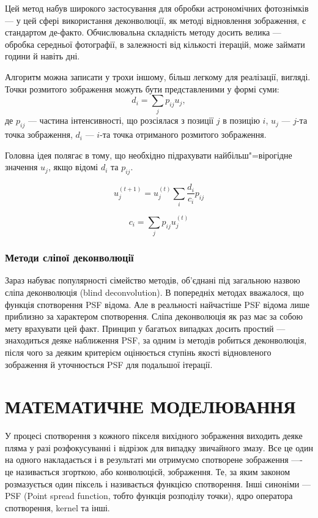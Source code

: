 \documentclass{diploma}
\begin{document}
      Цей метод набув широкого застосування для обробки астрономічних
      фотознімків --- у цей сфері використання деконволюції, як методі
      відновлення зображення, є стандартом де-факто.
      Обчислювальна складність методу досить велика --- обробка середньої
      фотографії, в залежності від кількості ітерацій, може займати години й
      навіть дні.

      Алгоритм можна записати у трохи іншому, більш легкому для реалізації,
      вигляді.
      Точки розмитого зображення можуть бути представленими у формі суми:
      \[ d_i = \sum_j p_{ij} u_j, \]
      де $p_{ij}$ --- частина інтенсивності, що розсіялася з позиції $j$ в
      позицію $i$, $u_j$ --- $j$-та точка зображення, $d_i$ --- $i$-та точка
      отриманого розмитого зображення.\cite{richardson-hadley}

      Головна ідея полягає в тому, що необхідно підрахувати найбільш"=вірогідне
      значення $u_j$, якщо відомі $d_i$ та $p_{ij}$.

      \begin{equation}
        u_j^{(t+1)} = u_j^{(t)} \sum_i \frac{d_i}{c_i} p_{ij}
        \label{eq:rl-deconv}
      \end{equation}

      \[c_i = \sum_j p_{ij} u_j^{(t)}\]
      \clearpage
    \subsection{Методи сліпої деконволюції}
      Зараз набуває популярності сімейство методів, об’єднані під загальною
      назвою сліпа деконволюція (blind deconvolution).
      В попередніх методах вважалося, що функція спотворення PSF відома.
      Але в реальності найчастіше PSF відома лише приблизно за характером
      спотворення.
      Сліпа деконволюція як раз має за собою мету врахувати цей факт.
      Принцип у багатьох випадках досить простий --- знаходиться деяке
      наближення PSF, за одним із методів робиться деконволюція, після чого за
      деяким критерієм оцінюється ступінь якості відновленого зображення й
      уточнюється PSF для подальшої ітерації.
      \clearpage
\chapter{МАТЕМАТИЧНЕ МОДЕЛЮВАННЯ}
  У процесі спотворення з кожного пікселя вихідного зображення виходить деяке
  пляма у разі розфокусуванні і відрізок для випадку звичайного змазу.
  Все це один на одного накладається і в результаті ми отримуємо спотворене
  зображення ---- це називається згорткою, або конволюцієй, зображення.
  Те, за яким законом розмазується один піксель і називається функцією
  спотворення.
  Інші синоніми --- PSF (Point spread function, тобто функція розподілу
  точки), ядро оператора спотворення, kernel та інші.
\end{document}
